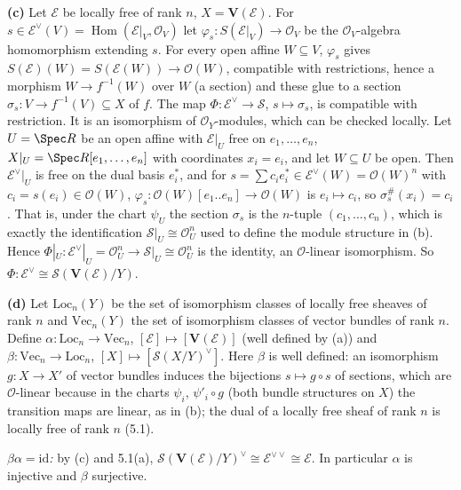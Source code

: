 \documentclass[11pt]{article}
\begin{document}
\textbf{(c)} Let $\mathcal E$ be locally free of rank $n$, $X=\mathbf V(\mathcal E)$. For $s\in\mathcal E^\vee(V)=\operatorname{Hom}(\mathcal E|_V,\mathcal O_V)$ let $\varphi_s:S(\mathcal E|_V)\to\mathcal O_V$ be the $\mathcal O_V$-algebra homomorphism extending $s$. For every open affine $W\subseteq V$, $\varphi_s$ gives $S(\mathcal E)(W)=S(\mathcal E(W))\to\mathcal O(W)$, compatible with restrictions, hence a morphism $W\to f^{-1}(W)$ over $W$ (a section) and these glue to a section $\sigma_s:V\to f^{-1}(V)\subseteq X$ of $f$. The map $\Phi:\mathcal E^\vee\to\mathcal S$, $s\mapsto\sigma_s$, is compatible with restriction. It is an isomorphism of $\mathcal O_Y$-modules, which can be checked locally. Let $U=\Spec R$ be an open affine with $\mathcal E|_U$ free on $e_1,\dots,e_n$, $X|_U=\Spec R[e_1,\dots,e_n]$ with coordinates $x_i=e_i$, and let $W\subseteq U$ be open. Then $\mathcal E^\vee|_U$ is free on the dual basis $e_i^*$, and for $s=\sum c_ie_i^*\in\mathcal E^\vee(W)=\mathcal O(W)^n$ with $c_i=s(e_i)\in\mathcal O(W)$, $\varphi_s:\mathcal O(W)[e_1..e_n]\to\mathcal O(W)$ is $e_i\mapsto c_i$, so $\sigma_s^\#(x_i)=c_i$. That is, under the chart $\psi_U$ the section $\sigma_s$ is the $n$-tuple $(c_1,\dots,c_n)$, which is exactly the identification $\mathcal S|_U\cong\mathcal O_U^n$ used to define the module structure in (b). Hence $\Phi|_U:\mathcal E^\vee|_U=\mathcal O_U^n\to\mathcal S|_U\cong\mathcal O_U^n$ is the identity, an $\mathcal O$-linear isomorphism. So $\Phi:\mathcal E^\vee\cong\mathcal S(\mathbf V(\mathcal E)/Y)$.

\textbf{(d)} Let $\mathrm{Loc}_n(Y)$ be the set of isomorphism classes of locally free sheaves of rank $n$ and $\mathrm{Vec}_n(Y)$ the set of isomorphism classes of vector bundles of rank $n$. Define $\alpha:\mathrm{Loc}_n\to\mathrm{Vec}_n$, $[\mathcal E]\mapsto[\mathbf V(\mathcal E)]$ (well defined by (a)) and $\beta:\mathrm{Vec}_n\to\mathrm{Loc}_n$, $[X]\mapsto[\mathcal S(X/Y)^\vee]$. Here $\beta$ is well defined: an isomorphism $g:X\to X'$ of vector bundles induces the bijections $s\mapsto g\circ s$ of sections, which are $\mathcal O$-linear because in the charts $\psi_i$, $\psi'_i\circ g$ (both bundle structures on $X$) the transition maps are linear, as in (b); the dual of a locally free sheaf of rank $n$ is locally free of rank $n$ (5.1).

\emph{$\beta\alpha=\mathrm{id}$:} by (c) and 5.1(a), $\mathcal S(\mathbf V(\mathcal E)/Y)^\vee\cong\mathcal E^{\vee\vee}\cong\mathcal E$. In particular $\alpha$ is injective and $\beta$ surjective.
\end{document}
